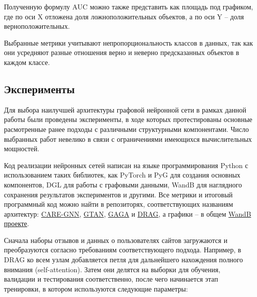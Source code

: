 Полученную формулу AUC можно также представить как площадь под графиком, где по оси X отложена доля ложноположительных объектов, а по оси Y -- доля верноположительных.

Выбранные метрики учитывают непропорциональность классов в данных, так как они усредняют разные отношения верно и неверно предсказанных объектов в каждом классе.

\pagebreak



\subsection{Эксперименты}

Для выбора наилучшей архитектуры графовой нейронной сети в рамках данной работы были проведены эксперименты, в ходе которых протестированы основные расмотренные ранее подходы с различными структурными компонентами. Число выбранных работ невелико в связи с ограничениями имеющихся вычислительных мощностей.

Код реализации нейронных сетей написан на языке программирования Python с использованием таких библиотек, как PyTorch и PyG для создания основных компонентов, DGL для работы с графовыми данными, WandB для наглядного сохранения результатов экспериментов и другими. Все метрики и итоговый программный код можно найти в репозиторях, соответствующих названиям архитектур: \href{https://github.com/qw1zzard/CARE-GNN}{CARE-GNN}, \href{https://github.com/qw1zzard/antifraud}{GTAN}, \href{https://github.com/qw1zzard/GAGA}{GAGA} и \href{https://github.com/qw1zzard/DRAG}{DRAG}, а графики -- в общем \href{https://wandb.ai/qw1zzard-wandb?shareProfileType=copy}{WandB проекте}.

Сначала наборы отзывов и данных о пользователях сайтов загружаются и преобразуются согласно требованиям соответствующего подхода. Например, в DRAG \cite{kim2023} ко всем узлам добавляется петля для дальнейшего нахождения полного внимания (self-attention). Затем они делятся на выборки для обучения, валидации и тестирования соответственно, после чего начинается этап тренировки, в котором используются следующие параметры:

